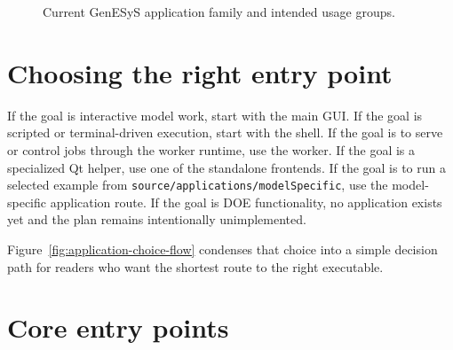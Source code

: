\begin{figure}[htbp]
\centering
{}
\caption{Current GenESyS application family and intended usage groups.}
\label{fig:application-family-tree}
\end{figure}

\section{Choosing the right entry point}
\label{sec:application-overview-entry-points}

If the goal is interactive model work, start with the main GUI. If the goal is
scripted or terminal-driven execution, start with the shell. If the goal is to
serve or control jobs through the worker runtime, use the worker. If the goal
is a specialized Qt helper, use one of the standalone frontends. If the goal
is to run a selected example from \texttt{source/applications/modelSpecific},
use the model-specific application route. If the goal is DOE functionality, no
application exists yet and the plan remains intentionally unimplemented.

Figure~\ref{fig:application-choice-flow} condenses that choice into a simple
decision path for readers who want the shortest route to the right executable.

\section{Core entry points}
\label{sec:application-overview-core-entry-points}

